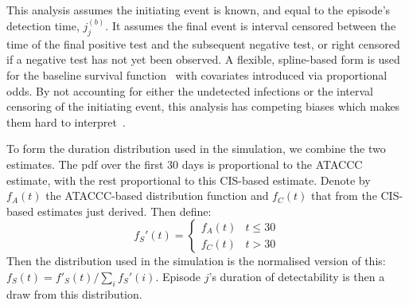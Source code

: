 \documentclass[12pt]{article}
\begin{document}
This analysis assumes the initiating event is known, and equal to the episode’s detection time, $j_j^{(b)}$.
It assumes the final event is interval censored between the time of the final positive test and the subsequent negative test, or right censored if a negative test has not yet been observed.
A flexible, spline-based form is used for the baseline survival function~\citep{roystonSTPM,roystonFlexible} with covariates introduced via proportional odds.
By not accounting for either the undetected infections or the interval censoring of the initiating event, this analysis has competing biases which makes them hard to interpret~\citep{cisMethodsONS}.

To form the duration distribution used in the simulation, we combine the two estimates.
The pdf over the first 30 days is proportional to the ATACCC estimate, with the rest proportional to this CIS-based estimate.
Denote by $f_A(t)$ the ATACCC-based distribution function and $f_C(t)$ that from the CIS-based estimates just derived.
Then define:
$$
f_S'(t) = \begin{cases}
	f_A(t) &t \leq 30 \\
	f_C(t) &t > 30
\end{cases}
$$
Then the distribution used in the simulation is the normalised version of this: $f_S(t) = f'_S(t)/\sum_i f_S'(i)$.
Episode $j$'s duration of detectability is then a draw from this distribution.
\end{document}
